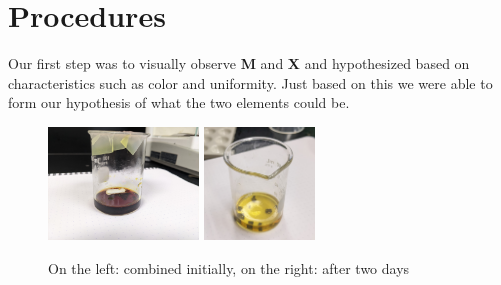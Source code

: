 \documentclass[titlepage]{article}
\begin{document}
\section{Procedures}

Our first step was to visually observe \textbf{M} and \textbf{X} and hypothesized based on characteristics such as color and uniformity. Just based on this we were able to form our hypothesis of what the two elements could be.

\begin{figure}[h]
    \centering
    \includegraphics[height=3cm]{MX_initial.png}
    \includegraphics[height=3cm]{MX_final.png}
    \caption{On the left:  combined initially, on the right:  after two days}
    \label{fig:mx_comparison}
\end{figure}
\end{document}
